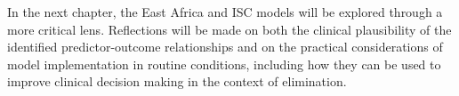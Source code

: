In the next chapter, the East Africa and ISC models will be explored through a more critical lens. Reflections will be made on both the clinical plausibility of the identified predictor-outcome relationships and on the practical considerations of model implementation in routine conditions, including how they can be used to improve clinical decision making in the context of elimination.